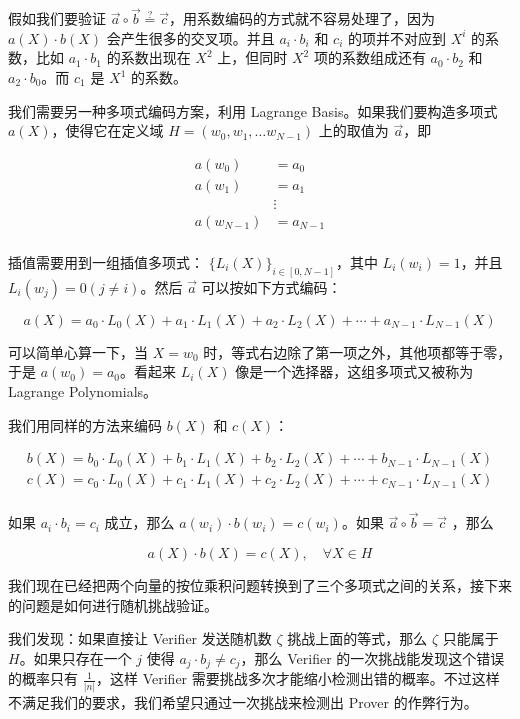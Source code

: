 假如我们要验证
\(\vec{a}\circ\vec{b}\overset{?}{=}\vec{c}\)，用系数编码的方式就不容易处理了，因为
\(a(X)\cdot b(X)\) 会产生很多的交叉项。并且 \(a_i\cdot b_i\) 和 \(c_i\)
的项并不对应到 \(X^i\) 的系数，比如 \(a_1\cdot b_1\) 的系数出现在
\(X^2\) 上，但同时 \(X^2\) 项的系数组成还有 \(a_0\cdot b_2\) 和
\(a_2\cdot b_0\)。而 \(c_1\) 是 \(X^1\) 的系数。

我们需要另一种多项式编码方案，利用 Lagrange Basis。如果我们要构造多项式
\(a(X)\)，使得它在定义域 \(H=(w_0, w_1, \ldots w_{N-1})\) 上的取值为
\(\vec{a}\)，即

\[
\begin{split}
a(w_0) &= a_0 \\
a(w_1) &= a_1 \\
&\vdots \\
a(w_{N-1}) &= a_{N-1} \\
\end{split}
\]

插值需要用到一组插值多项式： \(\{L_i(X)\}_{i\in[0,N-1]}\)，其中
\(L_i(w_i)=1\)，并且 \(L_i(w_j)=0 (j\neq i)\)。然后 \(\vec{a}\)
可以按如下方式编码：

\[
a(X)=a_0\cdot L_0(X) + a_1\cdot L_1(X)+ a_2\cdot L_2(X) + \cdots + a_{N-1}\cdot L_{N-1}(X)
\]

可以简单心算一下，当 \(X=w_0\)
时，等式右边除了第一项之外，其他项都等于零，于是 \(a(w_0)=a_0\)。看起来
\(L_i(X)\) 像是一个选择器，这组多项式又被称为 Lagrange Polynomials。

我们用同样的方法来编码 \(b(X)\) 和 \(c(X)\)：

\[
\begin{split}
b(X)=b_0\cdot L_0(X) + b_1\cdot L_1(X)+ b_2\cdot L_2(X) + \cdots + b_{N-1}\cdot L_{N-1}(X) \\
c(X)=c_0\cdot L_0(X) + c_1\cdot L_1(X)+ c_2\cdot L_2(X) + \cdots + c_{N-1}\cdot L_{N-1}(X) \\
\end{split}
\]

如果 \(a_i\cdot b_i = c_i\) 成立，那么
\(a(w_i)\cdot b(w_i) = c(w_i)\)。如果 \(\vec{a}\circ\vec{b}{=}\vec{c}\)
，那么

\[
a(X)\cdot b(X) = c(X),\quad \forall X\in H
\]

我们现在已经把两个向量的按位乘积问题转换到了三个多项式之间的关系，接下来的问题是如何进行随机挑战验证。

我们发现：如果直接让 Verifier 发送随机数 \(\zeta\) 挑战上面的等式，那么
\(\zeta\) 只能属于 \(H\)。如果只存在一个 \(j\) 使得
\(a_j\cdot b_j\neq c_j\)，那么 Verifier
的一次挑战能发现这个错误的概率只有 \(\frac{1}{|n|}\)，这样 Verifier
需要挑战多次才能缩小检测出错的概率。不过这样不满足我们的要求，我们希望只通过一次挑战来检测出
Prover 的作弊行为。

